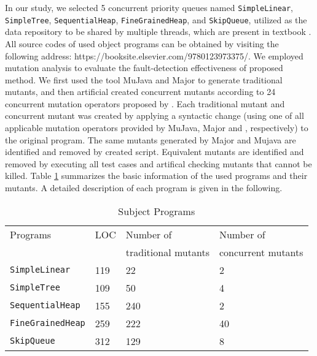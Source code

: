 \documentclass[conference]{IEEEtran}
\theoremstyle{remark}
\begin{document}
In our study, we selected 5 concurrent priority queues named \texttt{SimpleLinear}, \texttt{SimpleTree}, \texttt{SequentialHeap},
\texttt{FineGrainedHeap}, and \texttt{SkipQueue}, utilized as the data repository to be shared by multiple threads, which are present in textbook \cite{PQUEUE}. All source codes of used object programs can be obtained by visiting the following address: https://booksite.elsevier.com/9780123973375/. We employed mutation analysis \cite{demillo1978hints, sun2017path} to evaluate the fault-detection effectiveness of proposed method.  We first used the tool MuJava \cite{ma2005mujava} and Major \cite{Just2014} to generate traditional mutants, and then artificial created concurrent mutants according to 24 concurrent mutation operators proposed by \cite{bradbury2006mutation}. Each traditional mutant and concurrent mutant was created by applying a syntactic change (using one of all applicable mutation operators provided by MuJava, Major and \cite{bradbury2006mutation}, respectively) to the original program. The same mutants generated by Major and Mujava are identified and removed by created script. Equivalent mutants are identified and removed by executing all test cases and artifical checking mutants that cannot be killed. Table \ref{tab:programs} summarizes the basic information of the used programs and their mutants. A detailed description of each program is given in the following.

\begin{table}[h]
\caption{Subject Programs}
\label{tab:programs}
\renewcommand\tabcolsep{5.0pt}
\begin{tabular}{llll} \toprule
Programs                   &LOC               & Number of             & Number of  \\ 
                           &                  & traditional mutants   & concurrent mutants \\ \midrule
\texttt{SimpleLinear}      &119               & 22                    & 2 \\ 
\texttt{SimpleTree}        &109               & 50                    & 4 \\ 
\texttt{SequentialHeap}    &155               & 240                   & 2 \\ 
\texttt{FineGrainedHeap}   &259               & 222                   & 40 \\ 
\texttt{SkipQueue}         &312               & 129                   & 8 \\ \bottomrule
\end{tabular}
\end{table}
\end{document}
